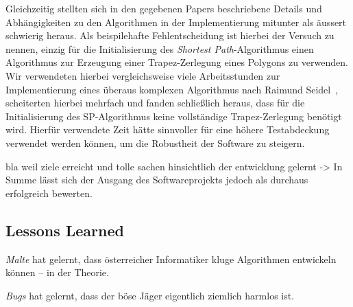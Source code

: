   Gleichzeitig stellten sich in den gegebenen Papers beschriebene Details und
  Abhängigkeiten zu den Algorithmen in der Implementierung mitunter als äussert
  schwierig heraus. Als beispilehafte Fehlentscheidung ist hierbei der Versuch
  zu nennen, einzig für die Initialisierung des \emph{Shortest Path}-Algorithmus
  einen Algorithmus zur Erzeugung einer Trapez-Zerlegung eines Polygons zu
  verwenden. Wir verwendeten hierbei vergleichsweise viele Arbeitsstunden zur
  Implementierung eines überaus komplexen Algorithmus nach Raimund
  Seidel~\cite{seidel91asimple}, scheiterten hierbei mehrfach und fanden
  schließlich heraus, dass für die Initialisierung des SP-Algorithmus keine
  vollständige Trapez-Zerlegung benötigt wird. Hierfür verwendete Zeit hätte
  sinnvoller für eine höhere Testabdeckung verwendet werden können, um die
  Robustheit der Software zu steigern.

  bla weil ziele erreicht und tolle sachen hinsichtlich der entwicklung gelernt
  -> In Summe lässt sich der Ausgang des Softwareprojekts jedoch als durchaus
  erfolgreich bewerten.

  \subsection{Lessons Learned}

  \begin{lessonlearned}
    \emph{Malte} hat gelernt, dass österreicher Informatiker kluge 
    Algorithmen entwickeln können -- in der Theorie.
  \end{lessonlearned}

  \begin{lessonlearned}
    \emph{Bugs} hat gelernt, dass der böse Jäger eigentlich 
    ziemlich harmlos ist.
  \end{lessonlearned}
